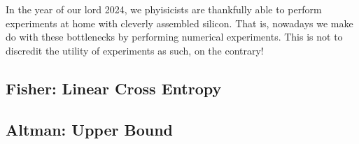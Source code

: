 In the year of our
lord 2024, we phyisicists are thankfully able to perform experiments at home
with cleverly assembled silicon.  That is, nowadays we make do with these
bottlenecks by performing numerical experiments. This is not to discredit the
utility of experiments as such, on the contrary! 

\subsection{Fisher: Linear Cross Entropy}
\cite{liCrossEntropyBenchmark2023}

\subsection{Altman: Upper Bound}
\cite{garrattProbingPostmeasurementEntanglement2023}
